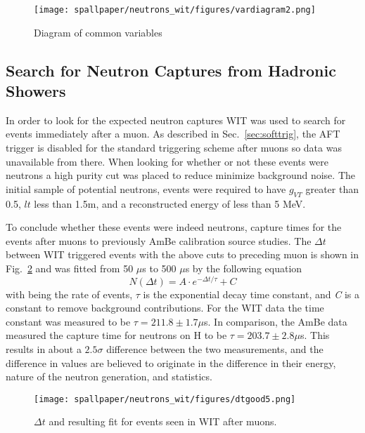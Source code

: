 \begin{figure}
    \centering
    \texttt{[image: spallpaper/neutrons\_wit/figures/vardiagram2.png]}
    \caption{Diagram of common variables}
    \label{fig:vardia}
\end{figure}

\subsection{Search for Neutron Captures from Hadronic Showers}
\label{sec:hadronic_data}
In order to look for the expected neutron captures WIT was used to search for events immediately after a muon. As described in Sec.~\ref{sec:softtrig}, the AFT trigger is disabled for the standard triggering scheme after muons so data was unavailable from there. When looking for whether or not these events were neutrons a high purity cut was placed to reduce minimize background noise. The initial sample of potential neutrons, events were required to have $g_{VT}$ greater than 0.5, $lt$ less than 1.5m, and a reconstructed energy of less than 5 MeV. 

To conclude whether these events were indeed neutrons, capture times for the events after muons to previously AmBe calibration source studies.  The $\Delta t$ between WIT triggered events with the above cuts to preceding muon is shown in Fig.~\ref{fig:neutdt} and was fitted from 50 $\mu$s to 500 $\mu$s by the following equation
\begin{equation}
    N(\Delta t) = A\cdot e^{-\Delta t/\tau} + C
\end{equation}
with {\itN} being the rate of events, $\tau$ is the exponential decay time constant, and {\it C} is a constant to remove background contributions. For the WIT data the time constant was measured to be $\tau = 211.8 \pm 1.7 \mu$s. In comparison, the AmBe data measured the capture time for neutrons on H to be $\tau = 203.7 \pm 2.8\mu$s. This results in about a $2.5\sigma$ difference between the two measurements, and the difference in values are believed to originate in the difference in their energy, nature of the neutron generation, and statistics.

\begin{figure}
    \centering
    \texttt{[image: spallpaper/neutrons\_wit/figures/dtgood5.png]}
    \caption{$\Delta t$ and resulting fit for events seen in WIT after muons.}
    \label{fig:neutdt}
\end{figure}

